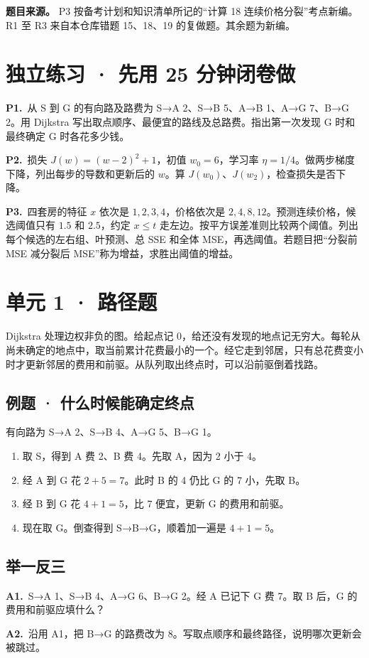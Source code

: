 \documentclass[UTF8,a4paper,11pt]{ctexart}
\newcommand{\PracticeQuestion}[3]{\par\Needspace{4\baselineskip}\noindent\begin{minipage}{\linewidth}\textbf{#1.}\ #2\par\noindent\rule{0pt}{#3mm}\par\end{minipage}\par}
\begin{document}
\textbf{题目来源。} P3 按备考计划和知识清单所记的“计算 18 连续价格分裂”考点新编。R1 至 R3 来自本仓库错题 15、18、19 的复做题。其余题为新编。

\section{独立练习 · 先用 25 分钟闭卷做}
\PracticeQuestion{P1}{从 S 到 G 的有向路及路费为 S→A 2、S→B 5、A→B 1、A→G 7、B→G 2。用 Dijkstra 写出取点顺序、最便宜的路线及总路费。指出第一次发现 G 时和最终确定 G 时各花多少钱。}{35}
\PracticeQuestion{P2}{损失 $J(w)=(w-2)^2+1$，初值 $w_0=6$，学习率 $\eta=1/4$。做两步梯度下降，列出每步的导数和更新后的 $w$。算 $J(w_0)$、$J(w_2)$，检查损失是否下降。}{35}
\PracticeQuestion{P3}{四套房的特征 $x$ 依次是 $1,2,3,4$，价格依次是 $2,4,8,12$。预测连续价格，候选阈值只有 $1.5$ 和 $2.5$，约定 $x\le t$ 走左边。按平方误差准则比较两个阈值。列出每个候选的左右组、叶预测、总 SSE 和全体 MSE，再选阈值。若题目把“分裂前 MSE 减分裂后 MSE”称为增益，求胜出阈值的增益。}{35}
\clearpage
\section{单元 1 · 路径题}
Dijkstra 处理边权非负的图。给起点记 0，给还没有发现的地点记无穷大。每轮从尚未确定的地点中，取当前累计花费最小的一个。经它走到邻居，只有总花费变小时才更新邻居的费用和前驱。从队列取出终点时，可以沿前驱倒着找路。

\subsection{例题 · 什么时候能确定终点}
有向路为 S→A 2、S→B 4、A→G 5、B→G 1。

\begin{enumerate}
\item 取 S，得到 A 费 2、B 费 4。先取 A，因为 2 小于 4。
\item 经 A 到 G 花 $2+5=7$。此时 B 的 4 仍比 G 的 7 小，先取 B。
\item 经 B 到 G 花 $4+1=5$，比 7 便宜，更新 G 的费用和前驱。
\item 现在取 G。倒查得到 S→B→G，顺着加一遍是 $4+1=5$。
\end{enumerate}
\subsection{举一反三}
\PracticeQuestion{A1}{S→A 1、S→B 4、A→G 6、B→G 2。经 A 已记下 G 费 7。取 B 后，G 的费用和前驱应填什么？}{23}
\PracticeQuestion{A2}{沿用 A1，把 B→G 的路费改为 8。写取点顺序和最终路径，说明哪次更新会被跳过。}{26}
\clearpage
\end{document}
